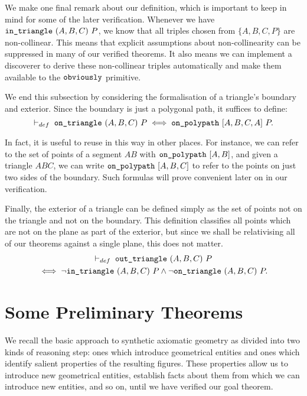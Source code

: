 
We make one final remark about our definition, which is important to keep in mind for some of the later verification. Whenever we have $\texttt{in\_triangle}\ (A,B,C)\ P$, we know that all triples chosen from $\{A,B,C,P\}$ are non-collinear. This means that explicit assumptions about non-collinearity can be suppressed in many of our verified theorems. It also means we can implement a discoverer  to derive these non-collinear triples automatically and make them available to the $\texttt{obviously}$ primitive. 

We end this subsection by considering the formalisation of a triangle's boundary and exterior. Since the boundary is just a polygonal path, it suffices to define:
\begin{equation}\label{eq:onTriangleDef}
\vdash_{def}\;\code{on\_triangle}\ (A,B,C)\ P \iff \code{on\_polypath}\ [A,B,C,A]\ P.
\end{equation}

In fact, it is useful to reuse  in this way in other places. For instance, we can refer to the set of points of a segment $AB$ with $\texttt{on\_polypath}\ [A,B]$, and given a triangle $ABC$, we can write $\code{on\_polypath}\ [A,B,C]$ to refer to the points on just two sides of the boundary. Such formulas will prove convenient later on in our verification.

Finally, the exterior of a triangle can be defined simply as the set of points not on the triangle and not on the boundary. This definition classifies all points which are not on the plane as part of the exterior, but since we shall be relativising all of our theorems against a single plane, this does not matter.
\begin{multline*}
  \vdash_{def}\;\code{out\_triangle}\ (A,B,C)\ P\\
  \iff \neg\code{in\_triangle}\ (A,B,C)\ P\wedge\neg\code{on\_triangle}\ (A,B,C)\ P.
\end{multline*}

\section{Some Preliminary Theorems}
We recall the basic approach to synthetic axiomatic geometry as divided into two kinds of reasoning step: ones which introduce geometrical entities and ones which identify salient properties of the resulting figures. These properties allow us to introduce new geometrical entities, establish facts about them from which we can introduce new entities, and so on, until we have verified our goal theorem. 

